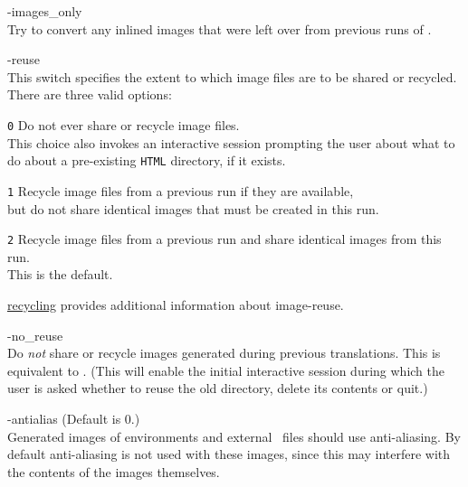 \begin{htmllist}
%
\item [ -images\_only\label{imagesonly}]
\\
Try to convert any inlined images that were left over from previous
runs of \latextohtml.


%
\begin{changebar}
\item [ -reuse \Meta{reuse\_option}\label{reuseoptions}]
\\
This switch specifies the extent to which image files are to be shared
or recycled.\html{\\}
There are three valid options:
%
\begin{htmllist}
%
\item [\texttt{0}]
Do not ever share or recycle image files.\\
This choice also invokes an interactive session
prompting the user about what to do about
a pre-existing \texttt{HTML} directory, if it exists.
%
%
\item [\texttt{1}]
Recycle image files from a previous run if they are available,\\
but do not share identical images that must be created in this run.
%
%
\item [\texttt{2}]
Recycle image files from a previous run and share identical
images from this run.\\
This is the default.
\end{htmllist}
\hyperref{A later section}{Section~}{}{recycling} provides
additional information about image-reuse.


%
\item [ -no\_reuse\label{noreuse}]
\\
Do \emph{not} share or recycle images generated during previous translations.
This is equivalent to .
(This will enable the initial interactive session during which the user is
asked whether to reuse the old directory, delete its contents or quit.)%
\end{changebar}


%
\begin{changebar}
\item [ -antialias\label{aalias}]
 (Default is 0.)\\
Generated images of  environments and external \PS\ files
should use anti-aliasing. By default anti-aliasing is not
used with these images, since this may interfere with the contents
of the images themselves.


\end{changebar}
\end{htmllist}
